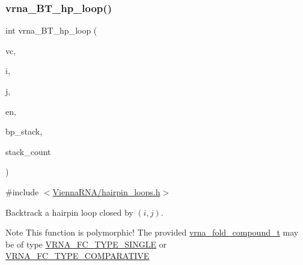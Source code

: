 \subsubsection{\texorpdfstring{vrna\+\_\+\+B\+T\+\_\+hp\+\_\+loop()}{vrna\_BT\_hp\_loop()}}
{\footnotesize\ttfamily int vrna\+\_\+\+B\+T\+\_\+hp\+\_\+loop (\begin{DoxyParamCaption}\item[{\hyperlink{group__fold__compound_ga1b0cef17fd40466cef5968eaeeff6166}{vrna\+\_\+fold\+\_\+compound\+\_\+t} $\ast$}]{vc,  }\item[{int}]{i,  }\item[{int}]{j,  }\item[{int}]{en,  }\item[{\hyperlink{group__data__structures_gaa651bda42e7692f08cb603cd6834b0ee}{vrna\+\_\+bp\+\_\+stack\+\_\+t} $\ast$}]{bp\+\_\+stack,  }\item[{int $\ast$}]{stack\+\_\+count }\end{DoxyParamCaption})}



{\ttfamily \#include $<$\hyperlink{hairpin__loops_8h}{Vienna\+R\+N\+A/hairpin\+\_\+loops.\+h}$>$}



Backtrack a hairpin loop closed by $ (i,j) $. 

\begin{DoxyNote}{Note}
This function is polymorphic! The provided \hyperlink{group__fold__compound_ga1b0cef17fd40466cef5968eaeeff6166}{vrna\+\_\+fold\+\_\+compound\+\_\+t} may be of type \hyperlink{group__fold__compound_gga01a4ff86fa71deaaa5d1abbd95a1447da7e264dd3cf2dc9b6448caabcb7763cd6}{V\+R\+N\+A\+\_\+\+F\+C\+\_\+\+T\+Y\+P\+E\+\_\+\+S\+I\+N\+G\+LE} or \hyperlink{group__fold__compound_gga01a4ff86fa71deaaa5d1abbd95a1447dab821ce46ea3cf665be97df22a76f5023}{V\+R\+N\+A\+\_\+\+F\+C\+\_\+\+T\+Y\+P\+E\+\_\+\+C\+O\+M\+P\+A\+R\+A\+T\+I\+VE} 
\end{DoxyNote}
\mbox{\label{group__loops_gaafbc187b7f78e8e82afb77dd6f3b8fc5}} 
